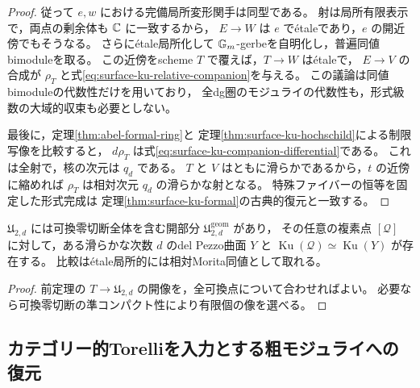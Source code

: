 \begin{proof}
従って $e,w$ における完備局所変形関手は同型である。
射は局所有限表示で，両点の剰余体も $\mathbb C$ に一致するから，
$E\to W$ は $e$ で\'{e}taleであり，$e$ の開近傍でもそうなる。
さらに\'{e}tale局所化して $\mathbb G_m$-gerbeを自明化し，普遍同値bimoduleを取る。
この近傍をscheme $T$ で覆えば，$T\to W$ は\'{e}taleで，
$E\to V$ の合成が $\rho_T$ と式\eqref{eq:surface-ku-relative-companion}を与える。
この議論は同値bimoduleの代数性だけを用いており，
全dg圏のモジュライの代数性も，形式級数の大域的収束も必要としない。

最後に，定理\ref{thm:abel-formal-ring}と
定理\ref{thm:surface-ku-hochschild}による制限写像を比較すると，
$d\rho_T$ は式\eqref{eq:surface-ku-companion-differential}である。
これは全射で，核の次元は $q_d$ である。
$T$ と $V$ はともに滑らかであるから，$t$ の近傍に縮めれば
$\rho_T$ は相対次元 $q_d$ の滑らかな射となる。
特殊ファイバーの恒等を固定した形式完成は
定理\ref{thm:surface-ku-formal}の古典的復元と一致する。
\end{proof}

\begin{corollary}[幾何化の開近傍]
\label{cor:surface-ku-geometric-open}
$\mathfrak U_{2,d}$ には可換零切断全体を含む開部分
$\mathfrak U^{\mathrm{geom}}_{2,d}$ があり，
その任意の複素点 $[\mathcal Q]$ に対して，ある滑らかな次数 $d$ のdel Pezzo曲面 $Y$ と
$\operatorname{Ku}(\mathcal Q)\simeq\operatorname{Ku}(Y)$ が存在する。
比較は\'{e}tale局所的には相対Morita同値として取れる。
\end{corollary}
\begin{proof}
前定理の $T\to\mathfrak U_{2,d}$ の開像を，全可換点について合わせればよい。
必要なら可換零切断の準コンパクト性により有限個の像を選べる。
\end{proof}

\subsection{カテゴリー的Torelliを入力とする粗モジュライへの復元}

